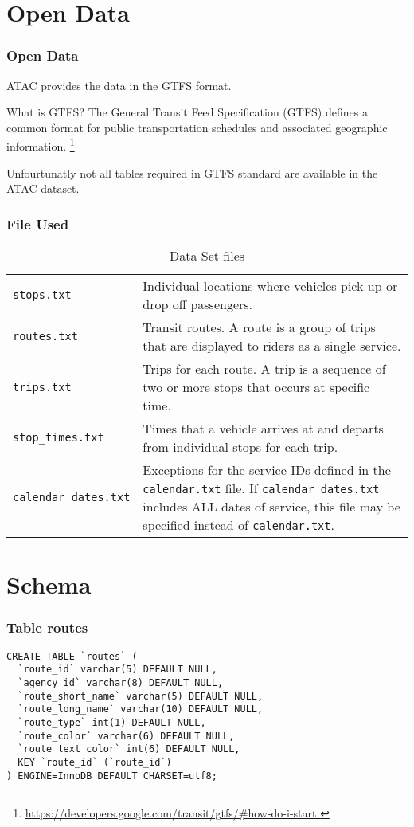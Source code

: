 \documentclass{beamer}
\begin{document}
\section{Open Data}
\begin{frame}
  \frametitle{Open Data}
  ATAC provides the data in the GTFS format. 
  
 \begin{block}{What is GTFS?}
The General Transit Feed Specification (GTFS) defines a common format
for public transportation schedules and associated geographic
information. \footnote[frame]{\url{https://developers.google.com/transit/gtfs/\#how-do-i-start
  }}
\end{block}

Unfourtunatly not all tables required in GTFS standard are available in the
ATAC dataset.
 \end{frame}
\begin{frame}[fragile]
\frametitle{File Used}
\begin{table}
  \centering
\small
  \begin{tabular}{p{3cm} p{8cm} }
 \verb|stops.txt| & Individual locations where vehicles pick up or drop off passengers.\\
\verb|routes.txt| & Transit routes. A route is a group of trips that are displayed to riders as a single service.\\
\verb|trips.txt|	& Trips for each route. A trip is a sequence of two or more stops that occurs at specific time.\\
\verb|stop_times.txt| & Times that a vehicle arrives at and departs
                        from individual stops for each trip.\\
\verb|calendar_dates.txt| & Exceptions for the service IDs defined in
                            the \verb!calendar.txt! file. If  \verb!calendar_dates.txt! includes ALL dates of service, this file may be specified instead of \verb!calendar.txt!.\\
  \end{tabular}
  \caption{Data Set files}
  \label{tab:tab1}
\end{table}
\end{frame}
\section{Schema}
\begin{frame}[fragile]
  \frametitle{Table routes}
  \begin{lstlisting}
CREATE TABLE `routes` (
  `route_id` varchar(5) DEFAULT NULL,
  `agency_id` varchar(8) DEFAULT NULL,
  `route_short_name` varchar(5) DEFAULT NULL,
  `route_long_name` varchar(10) DEFAULT NULL,
  `route_type` int(1) DEFAULT NULL,
  `route_color` varchar(6) DEFAULT NULL,
  `route_text_color` int(6) DEFAULT NULL,
  KEY `route_id` (`route_id`)
) ENGINE=InnoDB DEFAULT CHARSET=utf8;
  \end{lstlisting}  
\end{frame}
\end{document}
